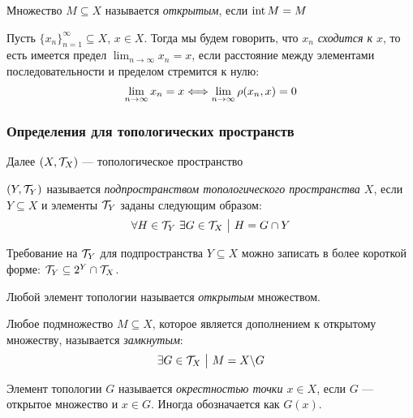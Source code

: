 \begin{definition}
	Множество $M \subseteq X$ называется \textit{открытым}, если $\operatorname{int} M = M$
\end{definition}

\begin{definition}
	Пусть $\{x_n\}_{n = 1}^\infty \subseteq X$, $x \in X$. Тогда мы будем говорить, что \textit{$x_n$ сходится к $x$}, то есть имеется предел $\lim_{n \to \infty} x_n = x$, если расстояние между элементами последовательности и пределом стремится к нулю:
	\[
		\lim_{n \to \infty} x_n = x \Longleftrightarrow \lim_{n \to \infty} \rho(x_n, x) = 0
	\]
\end{definition}

\subsubsection*{Определения для топологических пространств}

\begin{note}
	Далее $(X, \mathcal{T}_X)$ --- топологическое пространство
\end{note}

\begin{definition}
	$(Y, \mathcal{T}_Y)$ называется \textit{подпространством топологического пространства $X$}, если $Y \subseteq X$ и элементы $\mathcal{T}_Y$ заданы следующим образом:
	\[
		\forall H \in \mathcal{T}_Y\ \exists G \in \mathcal{T}_X \ \big|\  H = G \cap Y
	\]
\end{definition}

\begin{anote}
	Требование на $\mathcal{T}_Y$ для подпространства $Y \subseteq X$ можно записать в более короткой форме: $\mathcal{T}_Y \subseteq 2^Y \cap \mathcal{T}_X$.
\end{anote}

\begin{definition}
	Любой элемент топологии называется \textit{открытым} множеством.
\end{definition}

\begin{definition}
	Любое подмножество $M \subseteq X$, которое является дополнением к открытому множеству, называется \textit{замкнутым}:
	\[
		\exists G \in \mathcal{T}_X \ \big|\  M = X \backslash G
	\]
\end{definition}

\begin{definition}
	Элемент топологии $G$ называется \textit{окрестностью точки $x \in X$}, если $G$ --- открытое множество и $x \in G$. Иногда обозначается как $G(x)$.
\end{definition}

